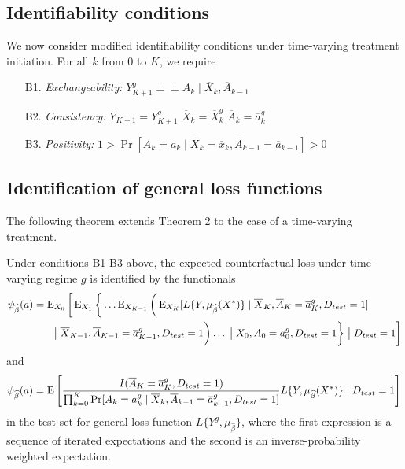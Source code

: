 \subsection{Identifiability conditions}
We now consider modified identifiability conditions under time-varying treatment initiation. For all $k$ from 0 to $K$, we require
\begin{enumerate}
    \item[B1.] \textit{Exchangeability:} $Y^g_{K+1} \perp \!\!\! \perp A_k \mid \overline{X}_k, \overline{A}_{k-1}$
    \item[B2.] \textit{Consistency:} $Y_{K+1} = Y^g_{K+1}$ $\overline{X}_{k} = \overline{X}^g_{k}$  $\overline{A}_k = \overline{a}_k^g$
    \item[B3.] \textit{Positivity:} $1 > \Pr[A_k = a_k \mid \overline{X}_k = \overline{x}_k, \overline{A}_{k -1} = \overline{a}_{k-1}] > 0$
\end{enumerate}

\subsection{Identification of general loss functions}
The following theorem extends Theorem 2 to the case of a time-varying treatment. 
\begin{theorem}
    Under conditions B1-B3 above, the expected counterfactual loss under time-varying regime $g$ is identified by the functionals
    \begin{align}\label{eqn:cl_tv_estimand}
    \begin{split}
        \psi_{\widehat{\beta}}(a) &= \operatorname{E}_{X_0}\bigg[\operatorname{E}_{X_1}\bigg\{\ldots \operatorname{E}_{X_{K-1}}\bigg(\operatorname{E}_{X_{K}}[L\{Y, \mu_{\widehat{\beta}}(X^*)\} \mid \overline{X}_K, \overline{A}_K=\overline{a}^g_K, D_{test} = 1] \\
        & \qquad \big\vert\; \overline{X}_{K-1}, \overline{A}_{K-1}=\overline{a}^g_{K-1}, D_{test} = 1\bigg) \ldots \;\big\vert\; X_{0}, A_{0}=a^g_{0}, D_{test} = 1\bigg\}\;\big\vert\; D_{test} = 1\bigg]
    \end{split}
    \end{align}
and 
    \begin{equation}\label{eqn:ipw_tv_estimand}
        \psi_{\widehat{\beta}}(a) = \operatorname{E}\left[\frac{I(\overline{A}_K = \overline{a}^g_K, D_{test} = 1)}{\prod_{k=0}^K\Pr[A_k = a^g_k \mid \overline{X}_k, \overline{A}_{k-1} = \overline{a}^g_{k-1}, D_{test} = 1]}L\{Y, \mu_{\widehat{\beta}}(X^*)\} \mid D_{test} = 1\right]
    \end{equation}
in the test set for general loss function $L\{Y^{g}, \mu_{\widehat{\beta}}\}$, where the first expression is a sequence of iterated expectations and the second is an inverse-probability weighted expectation.
\end{theorem}

